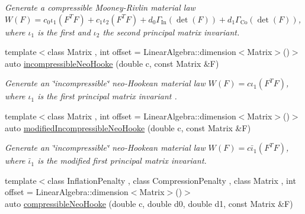 \begin{DoxyCompactItemize}
\begin{DoxyCompactList}\small\item\em Generate a compressible Mooney-\/\-Rivlin material law $ W(F)=c_0\iota_1(F^T F) + c_1\iota_2(F^T F) + d_0\Gamma_\mathrm{In}(\det(F))+d_1\Gamma_\mathrm{Co}(\det(F)) $, where $\iota_1$ is the first and $\iota_2$ the second principal matrix invariant. \end{DoxyCompactList}\item 
\hypertarget{group__Rubber_ga554b9bf515aa99d3bdc9e230f2a65bca}{{\footnotesize template$<$class Matrix , int offset = Linear\-Algebra\-::dimension$<$\-Matrix$>$()$>$ }\\auto \hyperlink{group__Rubber_ga554b9bf515aa99d3bdc9e230f2a65bca}{incompressible\-Neo\-Hooke} (double c, const Matrix \&F)}\label{group__Rubber_ga554b9bf515aa99d3bdc9e230f2a65bca}

\begin{DoxyCompactList}\small\item\em Generate an \char`\"{}incompressible\char`\"{} neo-\/\-Hookean material law $ W(F)=c\iota_1(F^T F) $, where $\iota_1$ is the first principal matrix invariant . \end{DoxyCompactList}\item 
\hypertarget{group__Rubber_ga1b6f97c769ead09a5b1dcdf4733e85aa}{{\footnotesize template$<$class Matrix , int offset = Linear\-Algebra\-::dimension$<$\-Matrix$>$()$>$ }\\auto \hyperlink{group__Rubber_ga1b6f97c769ead09a5b1dcdf4733e85aa}{modified\-Incompressible\-Neo\-Hooke} (double c, const Matrix \&F)}\label{group__Rubber_ga1b6f97c769ead09a5b1dcdf4733e85aa}

\begin{DoxyCompactList}\small\item\em Generate an \char`\"{}incompressible\char`\"{} neo-\/\-Hookean material law $ W(F)=c\bar\iota_1(F^T F) $, where $\bar\iota_1$ is the modified first principal matrix invariant. \end{DoxyCompactList}\item 
\hypertarget{group__Rubber_ga35a60a5ae50481becd543140ba82c171}{{\footnotesize template$<$class Inflation\-Penalty , class Compression\-Penalty , class Matrix , int offset = Linear\-Algebra\-::dimension$<$\-Matrix$>$()$>$ }\\auto \hyperlink{group__Rubber_ga35a60a5ae50481becd543140ba82c171}{compressible\-Neo\-Hooke} (double c, double d0, double d1, const Matrix \&F)}\label{group__Rubber_ga35a60a5ae50481becd543140ba82c171}


\end{DoxyCompactItemize}
